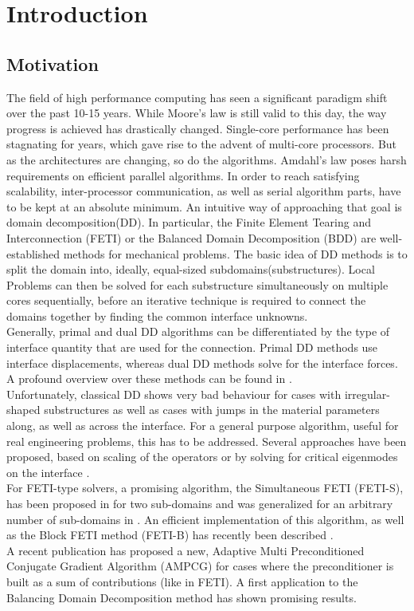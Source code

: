 \chapter{Introduction}\label{cha:introduction}
\section{Motivation}\label{sec:motivation}
The field of high performance computing has seen a significant paradigm shift over the past 10-15 years. While Moore's law \cite{Moore1965} is still valid to this day, the way progress is achieved has drastically changed. Single-core performance has been stagnating for years, which gave rise to the advent of multi-core processors. But as the architectures are changing, so do the algorithms. Amdahl's law\cite{Rodgers1985} poses harsh requirements on efficient parallel algorithms. In order to reach satisfying scalability, inter-processor communication, as well as serial algorithm parts, have to be kept at an absolute minimum.
An intuitive way of approaching that goal is domain decomposition(DD). In particular, the Finite Element Tearing and Interconnection (FETI) or the Balanced Domain Decomposition (BDD) are well-established methods for mechanical problems.
The basic idea of DD methods is to split the domain into, ideally, equal-sized subdomains(substructures). Local Problems can then be solved for each substructure simultaneously on multiple cores sequentially, before an iterative technique is required to connect the domains together by finding the common interface unknowns.\\
Generally, primal and dual DD algorithms can be differentiated by the type of interface quantity that are used for the connection. Primal DD methods use interface displacements, whereas dual DD methods solve for the interface forces. A profound overview over these methods can be found in \cite{Gosselet2006}.\\
Unfortunately, classical DD shows very bad behaviour for cases with irregular-shaped substructures as well as cases with jumps in the material parameters along, as well as across the interface. For a general purpose algorithm, useful for real engineering problems, this has to be addressed. Several approaches have been proposed, based on scaling of the operators \cite{DaVeiga2014} or by solving for critical eigenmodes on the interface \cite{Spillane2013, Spillane2014}.\\
For FETI-type solvers, a promising  algorithm, the Simultaneous FETI (FETI-S), has been proposed in \cite{RixenPhD} for two sub-domains and was generalized for an arbitrary number of sub-domains in \cite{Rixen2013}.
An efficient implementation of this algorithm, as well as the Block FETI method (FETI-B) has recently been described \cite{Gosselet2015}.\\
A recent publication \cite{Spillane2016} has proposed a new, Adaptive Multi Preconditioned Conjugate Gradient Algorithm (AMPCG) for cases where the preconditioner is built as a sum of contributions (like in FETI). A first application to the Balancing Domain Decomposition method has shown promising results.
